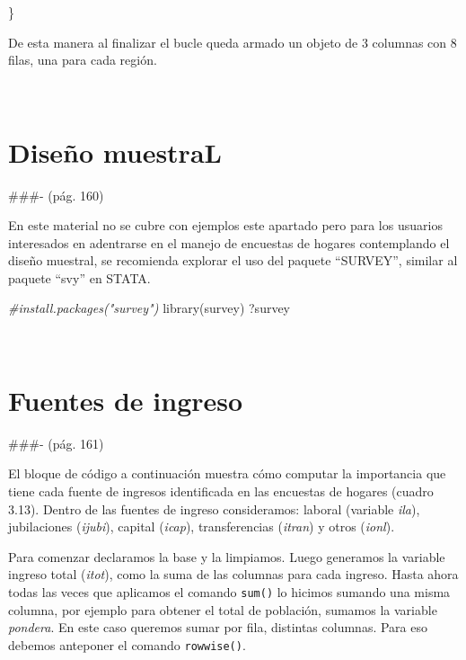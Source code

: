 \documentclass[
]{book}
\newenvironment{Shaded}{\begin{snugshade}}{\end{snugshade}}
\newcommand{\CommentTok}[1]{\textcolor[rgb]{0.56,0.35,0.01}{\textit{#1}}}
\newcommand{\FunctionTok}[1]{\textcolor[rgb]{0.00,0.00,0.00}{#1}}
\newcommand{\NormalTok}[1]{#1}
\begin{document}
\begin{Shaded}
\begin{Highlighting}[]
\NormalTok{\}}
\end{Highlighting}
\end{Shaded}

De esta manera al finalizar el bucle queda armado un objeto de 3 columnas con 8 filas, una para cada región.

~

\hypertarget{diseuxf1o-muestral}{%
\section{Diseño muestraL}\label{diseuxf1o-muestral}}

\#\#\#- (pág. 160)

En este material no se cubre con ejemplos este apartado pero para los usuarios interesados en adentrarse en el manejo de encuestas de hogares contemplando el diseño muestral, se recomienda explorar el uso del paquete ``SURVEY'', similar al paquete ``svy'' en STATA.

\begin{Shaded}
\begin{Highlighting}[]
\CommentTok{\#install.packages("survey")}
\FunctionTok{library}\NormalTok{(survey)}
\NormalTok{?survey}
\end{Highlighting}
\end{Shaded}

~

\hypertarget{fuentes-de-ingreso}{%
\section{Fuentes de ingreso}\label{fuentes-de-ingreso}}

\#\#\#- (pág. 161)

El bloque de código a continuación muestra cómo computar la importancia que tiene cada fuente de ingresos identificada en las encuestas de hogares (cuadro 3.13). Dentro de las fuentes de ingreso consideramos: laboral (variable \emph{ila}), jubilaciones (\emph{ijubi}), capital (\emph{icap}), transferencias (\emph{itran}) y otros (\emph{ionl}).

Para comenzar declaramos la base y la limpiamos. Luego generamos la variable ingreso total (\emph{itot}), como la suma de las columnas para cada ingreso. Hasta ahora todas las veces que aplicamos el comando \texttt{sum()} lo hicimos sumando una misma columna, por ejemplo para obtener el total de población, sumamos la variable \emph{pondera}. En este caso queremos sumar por fila, distintas columnas. Para eso debemos anteponer el comando \texttt{rowwise()}.
\end{document}
